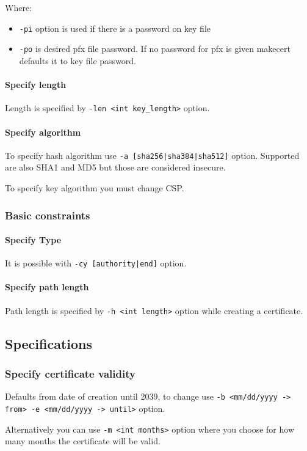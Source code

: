 \documentclass[10pt, a4paper]{report}
\begin{document}
Where:
\begin{itemize}
\item \verb+-pi+ option is used if there is a password on key file
\item \verb+-po+ is desired pfx file password. If no password for pfx is given makecert defaults it to key file password.
\end{itemize}

      \paragraph{Specify length}
Length is specified by \verb+-len <int key_length>+ option.
      \paragraph{Specify algorithm}
To specify hash algorithm use \verb+-a [sha256|sha384|sha512]+ option. Supported are also SHA1 and MD5 but those are considered insecure.

To specify key algorithm you must change CSP.
    \subsubsection{Basic constraints}
    
      \paragraph{Specify Type}
It is possible with \verb+-cy [authority|end]+ option.

      \paragraph{Specify path length}
Path length is specified by \verb+-h <int length>+ option while creating a certificate.

  \subsection{Specifications}
  
    \subsubsection{Specify certificate validity}
Defaults from date of creation until 2039, to change use \verb+-b <mm/dd/yyyy -> from> -e <mm/dd/yyyy -> until>+ option.

Alternatively you can use \verb+-m <int months>+ option where you choose for how many months the certificate will be valid.
\end{document}
